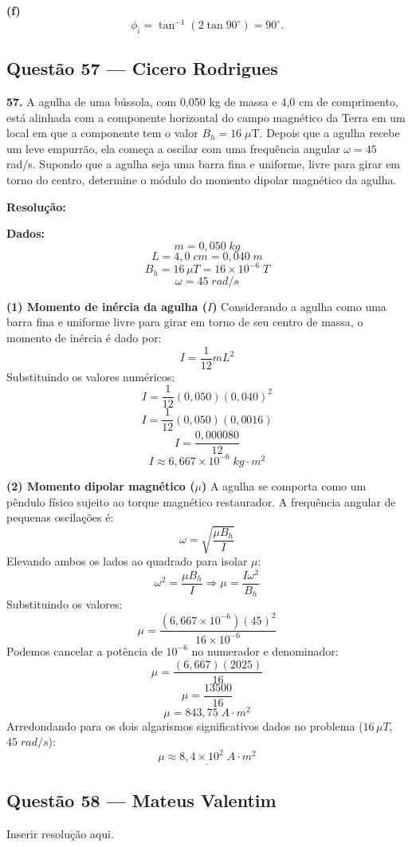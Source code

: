 \documentclass[12pt,a4paper]{article}
\begin{document}
	\textbf{(f)}
\[
\phi_i=\tan^{-1}(2\tan 90^\circ)=90^\circ.
\]

\subsection{Questão 57 — Cicero Rodrigues}

\textbf{57. }\normalfont A agulha de uma bússola, com 0,050 kg de massa e 4,0 cm de comprimento, está alinhada com a componente horizontal do campo magnético da Terra em um local em que a componente tem o valor $B_h = 16\;\mu$T. Depois que a agulha recebe um leve empurrão, ela começa a oscilar com uma frequência angular $\omega = 45$ rad/s. Supondo que a agulha seja uma barra fina e uniforme, livre para girar em torno do centro, determine o módulo do momento dipolar magnético da agulha.

\textbf{Resolução:}
\vspace{0.3cm}

\textbf{Dados:}
\[m = 0,050\;kg\]
\[L = 4,0\;cm = 0,040\;m\]
\[B_h = 16\,\mu T = 16 \times 10^{-6}\;T\]
\[\omega = 45\;rad/s\]

\vspace{0.2cm}
\textbf{(1) Momento de inércia da agulha (\(I\))}
Considerando a agulha como uma barra fina e uniforme livre para girar em torno de seu centro de massa, o momento de inércia é dado por:
\[I = \frac{1}{12}mL^2\]
Substituindo os valores numéricos:
\[I = \frac{1}{12}(0,050)(0,040)^2\]
\[I = \frac{1}{12}(0,050)(0,0016)\]
\[I = \frac{0,000080}{12}\]
\[I \approx 6,667 \times 10^{-6}\;kg\cdot m^2\]

\vspace{0.2cm}
\textbf{(2) Momento dipolar magnético (\(\mu\))}
A agulha se comporta como um pêndulo físico sujeito ao torque magnético restaurador. A frequência angular de pequenas oscilações é:
\[\omega = \sqrt{\frac{\mu B_h}{I}}\]
Elevando ambos os lados ao quadrado para isolar \(\mu\):
\[\omega^2 = \frac{\mu B_h}{I} \Rightarrow \mu = \frac{I \omega^2}{B_h}\]
Substituindo os valores:
\[\mu = \frac{(6,667 \times 10^{-6})(45)^2}{16 \times 10^{-6}}\]
Podemos cancelar a potência de \(10^{-6}\) no numerador e denominador:
\[\mu = \frac{(6,667)(2025)}{16}\]
\[\mu = \frac{13500}{16}\]
\[\mu = 843,75\;A\cdot m^2\]
Arredondando para os dois algarismos significativos dados no problema (\(16\,\mu T\), \(45\;rad/s\)):
\[\underline{\mu \approx 8,4 \times 10^2\;A\cdot m^2}\]

\subsection{Questão 58 — Mateus Valentim}
Inserir resolução aqui.
\end{document}
